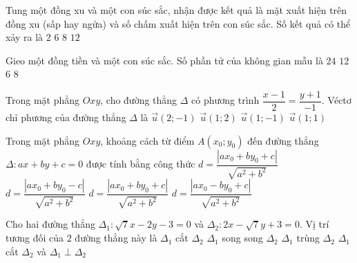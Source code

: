 \begin{ex}%
	Tung một đồng xu và một con súc sắc, nhận được kết quả là mặt xuất hiện trên đồng xu (sấp hay ngửa) và số chấm xuất hiện trên con súc sắc. Số kết quả có thể xảy ra là
	\choice
	{$2$}
	{$6$}
	{$8$}
	{\True $12$}
\end{ex}

\begin{ex}%
	Gieo một đồng tiền và một con súc sắc. Số phần tử của không gian mẫu là
	\choice
	{$24$}
	{\True $12$}
	{$6$}
	{$8$}
\end{ex}

\begin{ex} %
	Trong mặt phẳng $O x y$, cho đường thẳng $\Delta$ có phương trình $\dfrac{x-1}{2}=\dfrac{y+1}{-1}$. Véctơ chỉ phương của đường thẳng $\Delta$ là
	\choice
	{\True $\vec{u}(2 ;-1)$}
	{$\vec{u}(1 ; 2)$}
	{$\vec{u}(1 ;-1)$}
	{$\vec{u}(1 ; 1)$}
\end{ex}

\begin{ex}
	Trong mặt phẳng $Oxy$, khoảng cách từ điểm $A(x_0;y_0)$ đến đường thẳng $\Delta \colon ax+by+c=0$ được tính bằng công thức
	\choice
	{$d=\dfrac{|ax_0+by_0+c|}{\sqrt{a^2+b^2}}$}
	{$d=\dfrac{|ax_0+by_0-c|}{\sqrt{a^2+b^2}}$}
	{\True $d=\dfrac{|ax_0+by_0+c|}{\sqrt{a^2+b^2}}$}
	{$d=\dfrac{|ax_0-by_0+c|}{\sqrt{a^2+b^2}}$}
\end{ex}

\begin{ex}%
	Cho hai đường thẳng $\Delta_1\colon \sqrt{7}x-2y-3=0$ và $\Delta_2\colon 2x-\sqrt{7}y+3=0$. Vị trí tương đối của $2$ đường thẳng này là
	\choice
	{\True $\Delta_1$ cắt $\Delta_2$}
	{$\Delta_1$ song song $\Delta_2$}
	{$\Delta_1$ trùng $\Delta_2$}
	{$\Delta_1$ cắt $\Delta_2$ và $\Delta_1 \perp \Delta_2$}
\end{ex}

